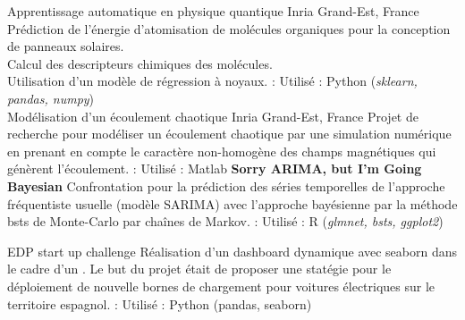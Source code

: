 \documentclass[cv]{cv_style}
\begin{document}
{\begin{minipage}[t]{\textwidth}
\begin{minipage}[t]{.94\textwidth}
        \cvproject
        {Apprentissage automatique en physique quantique}
        {Inria Grand-Est, France}
        {Prédiction de l'énergie d'atomisation de molécules organiques pour la conception de panneaux solaires.\\
            \rightchevron\hspace{.1cm} Calcul des descripteurs chimiques des molécules. \\
            \rightchevron\hspace{.1cm} Utilisation d'un modèle de régression à noyaux.
        }
        {
            \faGithub:  
        }
        {Utilisé :}
        {Python (\textit{sklearn, pandas, numpy})} 
\vspace{-0.45cm}\\
        \cvproject
        {Modélisation d'un écoulement chaotique}
        {Inria Grand-Est, France}
        {Projet de recherche pour modéliser un écoulement chaotique par une simulation numérique en prenant en compte le caractère non-homogène des champs magnétiques qui génèrent l'écoulement.
        }
        {
            \faGithub:  
        }
        {Utilisé :}
        {Matlab}
        \cvproject
        {\textbf{Sorry ARIMA, but I’m Going Bayesian}}
        {}
        {Confrontation pour la prédiction des séries temporelles de l'approche fréquentiste usuelle (modèle SARIMA) avec l'approche bayésienne par la méthode bsts de Monte-Carlo par chaînes de Markov.  
        }
        {
            \faGithub:  
        }
        {Utilisé :}
        {R (\textit{glmnet, bsts, ggplot2})}

        \cvproject
        {EDP start up challenge}
        {}
        {Réalisation d'un dashboard dynamique avec seaborn dans le cadre d'un . Le but du projet était de proposer une statégie pour le déploiement de nouvelle bornes de chargement pour voitures électriques sur le territoire espagnol. 
        }
        {
            \faGithub:  
        }
        {Utilisé :}
        {Python (pandas, seaborn)}


\end{minipage}
\end{minipage}}
\end{document}
